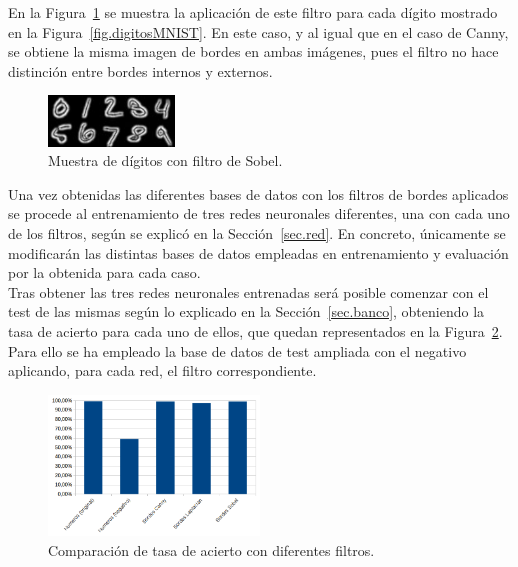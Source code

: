 \begin{description}
	En la Figura~\ref{fig.sobel} se muestra la aplicación de este filtro para cada dígito mostrado en la Figura~\ref{fig.digitosMNIST}. En este caso, y al igual que en el caso de Canny, se obtiene la misma imagen de bordes en ambas imágenes, pues el filtro no hace distinción entre bordes internos y externos.
	
	\begin{figure}[H]
		\begin{center}
			\includegraphics[width=0.3\textwidth]{figures/sobel}
			\caption{Muestra de dígitos con filtro de Sobel.}
			\label{fig.sobel}
		\end{center}
	\end{figure}	
\end{description}
\vspace{-10pt}

Una vez obtenidas las diferentes bases de datos con los filtros de bordes aplicados se procede al entrenamiento de tres redes neuronales diferentes, una con cada uno de los filtros, según se explicó en la Sección~\ref{sec.red}. En concreto, únicamente se modificarán las distintas bases de datos empleadas en entrenamiento y evaluación por la obtenida para cada caso.\\

Tras obtener las tres redes neuronales entrenadas será posible comenzar con el test de las mismas según lo explicado en la Sección~\ref{sec.banco}, obteniendo la tasa de acierto para cada uno de ellos, que quedan representados en la Figura~\ref{fig.filtros}. Para ello se ha empleado la base de datos de test ampliada con el negativo aplicando, para cada red, el filtro correspondiente.

\begin{figure}[H]
	\begin{center}
		\includegraphics[width=0.5\textwidth]{figures/filtros}
		\caption{Comparación de tasa de acierto con diferentes filtros.}
		\label{fig.filtros}
	\end{center}
\end{figure}

